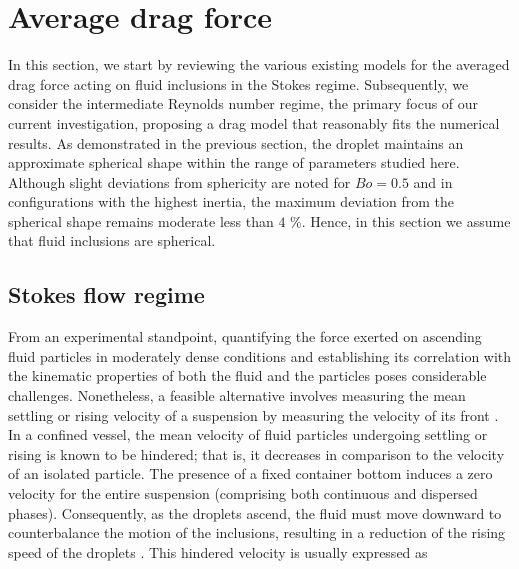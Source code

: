 \section{Average drag force}

In this section, we start by reviewing the various existing models for the averaged drag force acting on fluid inclusions in the Stokes regime. Subsequently, we consider the intermediate Reynolds number regime, the primary focus of our current investigation, proposing a drag model that reasonably fits the numerical results. 
As demonstrated in the previous section, the droplet maintains an approximate spherical shape within the range of parameters studied here. Although slight deviations from sphericity are noted for $Bo=0.5$ and in configurations with the highest inertia, the maximum deviation from the spherical shape remains moderate less than $4$ \%. 
Hence, in this section we assume that fluid inclusions are spherical.



\subsection{Stokes flow regime}


From an experimental standpoint, quantifying the force exerted on ascending fluid particles in moderately dense conditions and establishing its correlation with the kinematic properties of both the fluid and the particles poses considerable challenges. Nonetheless, a feasible alternative involves measuring the mean settling or rising velocity of a suspension by measuring the velocity of its front \citep{guazzelli2011}. In a confined vessel, the mean velocity of fluid particles undergoing settling or rising is known to be hindered; that is, it decreases in comparison to the velocity of an isolated particle. The presence of a fixed container bottom induces a zero velocity for the entire suspension (comprising both continuous and dispersed phases). Consequently, as the droplets ascend, the fluid must move downward to counterbalance the motion of the inclusions, resulting in a reduction of the rising speed of the droplets \citep{guazzelli2011}. This hindered velocity is usually expressed as

